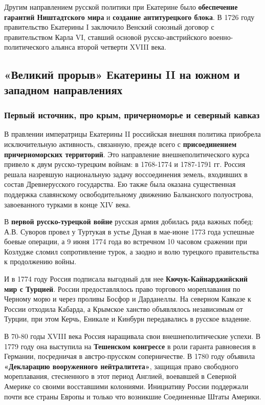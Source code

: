 \documentclass{article}
\begin{document}
\hfill

Другим направлением русской политики при Екатерине было \textbf{обеспечение гарантий Ништадтского мира} и \textbf{создание антитурецкого блока}. В 1726 году правительство Екатерины I заключило Венский союзный договор с правительством Карла VI, ставший основой русско-австрийского военно-политического альянса второй четверти XVIII века.

\pagebreak
\subsection{«Великий прорыв» Екатерины II на южном и западном направлениях}

\subsubsection{Первый источник, про крым, причерноморье и северный кавказ}

В правлении императрицы Екатерины II российская внешняя политика приобрела исключительную активность, связанную, прежде всего с \textbf{присоединением причерноморских территорий}. Это направление внешнеполитического курса привело к двум русско-турецким войнам: в 1768-1774 и 1787-1791 гг. Россия решала назревшую национальную задачу воссоединения земель, входивших в состав Древнерусского государства. Ею также была оказана существенная поддержка славянскому освободительному движению Балканского полуострова, завоеванного турками в конце XIV века.

В \textbf{первой русско-турецкой войне} русская армия добилась ряда важных побед: А.В. Суворов провел у Туртукая в устье Дуная в мае-июне 1773 года успешные боевые операции, а 9 июня 1774 года во встречном 10 часовом сражении при Козлудже сломил сопротивление турок, а заодно и волю турецкого правительства к продолжению войны.

И в 1774 году Россия подписала выгодный для нее \textbf{Кючук-Кайнарджийский мир с Турцией}. России предоставлялось право торгового мореплавания по Черному морю и через проливы Босфор и Дарданеллы. На северном Кавказе к России отходила Кабарда, а Крымское ханство объявлялось независимым от Турции, при этом Керчь, Еникале и Кинбурн передавались в русское владение.

\hfill

В 70-80 годы XVIII века Россия наращивала свои внешнеполитические успехи. В 1779 году она выступила на \textbf{Тешенском конгрессе} в роли гаранта равновесия в Германии, посредничая в австро-прусском соперничестве. В 1780 году объявила \textbf{«Декларацию вооруженного нейтралитета»}, защищая право свободного мореплавания, стесненного в этот период Англией, воевавшей в Северной Америке со своими восставшими колониями. Инициативу России поддержали почти все страны Европы и только что возникшие Соединенные Штаты Америки.
\end{document}
